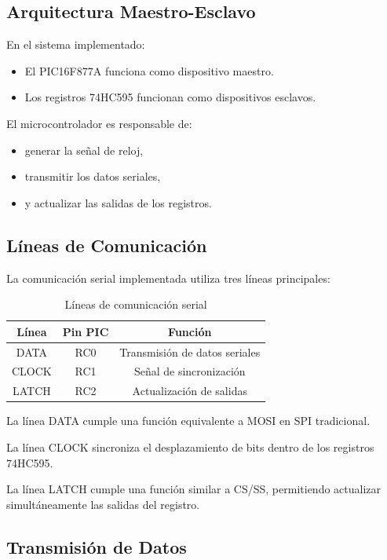 \subsection{Arquitectura Maestro-Esclavo}

En el sistema implementado:

\begin{itemize}
    \item El PIC16F877A funciona como dispositivo maestro.
    \item Los registros 74HC595 funcionan como dispositivos esclavos.
\end{itemize}

El microcontrolador es responsable de:

\begin{itemize}
    \item generar la señal de reloj,
    \item transmitir los datos seriales,
    \item y actualizar las salidas de los registros.
\end{itemize}

\subsection{Líneas de Comunicación}

La comunicación serial implementada utiliza tres líneas principales:

\begin{table}[H]
\centering
\begin{tabular}{|c|c|c|}
\hline
\textbf{Línea} & \textbf{Pin PIC} & \textbf{Función} \\
\hline
DATA & RC0 & Transmisión de datos seriales \\
\hline
CLOCK & RC1 & Señal de sincronización \\
\hline
LATCH & RC2 & Actualización de salidas \\
\hline
\end{tabular}
\caption{Líneas de comunicación serial}
\end{table}

La línea DATA cumple una función equivalente a MOSI en SPI tradicional.

La línea CLOCK sincroniza el desplazamiento de bits dentro de los registros 74HC595.

La línea LATCH cumple una función similar a CS/SS, permitiendo actualizar simultáneamente las salidas del registro.

\subsection{Transmisión de Datos}

